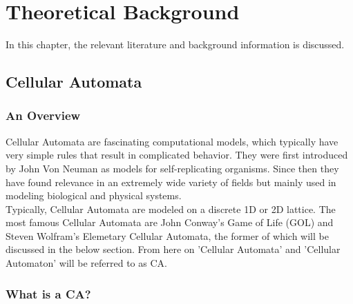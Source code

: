 
\chapter{Theoretical Background} %
\label{Chapter2} %
In this chapter, the relevant literature and background information is discussed.  
\section{Cellular Automata}
\subsection{An Overview}

Cellular Automata are fascinating computational models, which typically have very simple rules that result in complicated behavior. They were first introduced by John Von Neuman \cite{sarkar2000brief} as models for self-replicating organisms. Since then they have found relevance in an extremely wide variety of fields but mainly used in modeling biological and physical systems. \\

Typically, Cellular Automata are modeled on a discrete 1D or 2D lattice. The most famous Cellular Automata are John Conway's Game of Life (GOL) and Steven Wolfram's Elemetary Cellular Automata, the former of which will be discussed in the below section.
From here on 'Cellular Automata' and 'Cellular Automaton' will be referred to as CA.
\subsection{What is a CA?}

